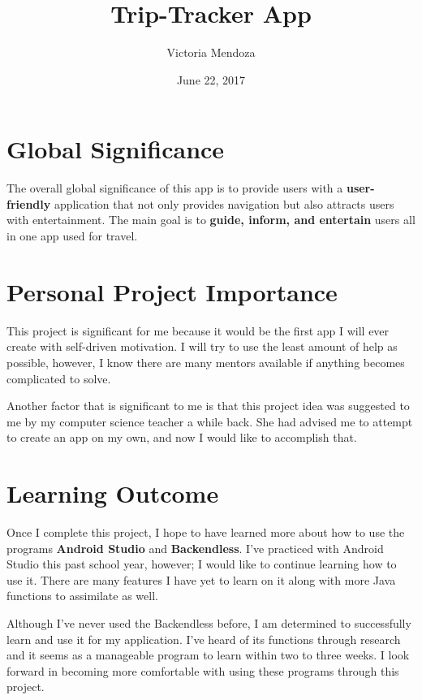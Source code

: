 \documentclass[20pt]{article}
\title{Trip-Tracker App}
\author{Victoria Mendoza}
\date{June 22, 2017}
\begin{document}
	\begin{titlepage}
		\maketitle 
		\tableofcontents
	\end{titlepage}

	\section{Global Significance} %
		\hspace*{.25 in}
		 The overall global significance of this app is to provide users with a \textbf{user-friendly} application that not only provides navigation but also attracts users with entertainment. The main goal is to \textbf{guide, inform, and entertain} users all in one app used for travel.
	\section{Personal Project Importance}
		\hspace{.25 in}
		This project is significant for me because it would be the first app I will ever create with self-driven motivation. I will try to use the least amount of help as possible, however, I know there are many mentors available if anything becomes complicated to solve. \\\par
		Another factor that is significant to me is that this project idea was suggested to me by my computer science teacher a while back. She had advised me to attempt to create an app on my own, and now I would like to accomplish that. 
	\section{Learning Outcome}
		\hspace*{.25 in}Once I complete this project, I hope to have learned more about how to use the programs \textbf{Android Studio} and \textbf{Backendless}. I've practiced with Android Studio this past school year, however; I would like to continue learning how to use it. There are many features I have yet to learn on it along with more Java functions to assimilate as well.\\\par
		Although I've never used the Backendless before, I am determined to successfully learn and use it for my application. I've heard of its functions through research and it seems as a manageable program to learn within two to three weeks. I look forward in becoming more comfortable with using these programs through this project.
		
\end{document}
